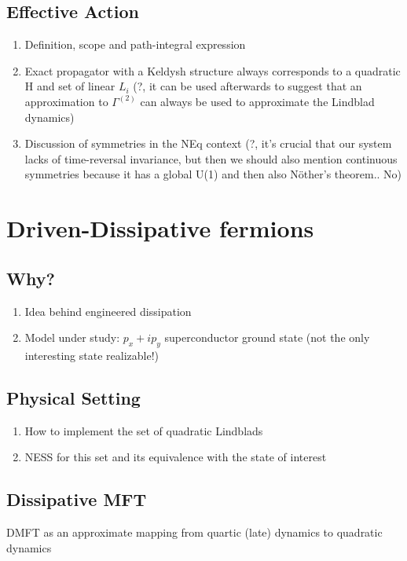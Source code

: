 \documentclass[a4paper,10pt]{article}
\theoremstyle{remark}
\newcommand{\nsec}{\vskip 0.8cm}
\begin{document}
  \subsection{Effective Action}
   \begin{enumerate}
    \item Definition, scope and path-integral expression
    \item Exact propagator with a Keldysh structure always corresponds to a quadratic H and set of linear $L_i$ (?, it can be used afterwards to suggest that an approximation to $\Gamma^{(2)}$ can always be used to approximate the Lindblad dynamics) 
    \item Discussion of symmetries in the NEq context (?, it's crucial that our system lacks of time-reversal invariance, but then we should also mention continuous symmetries because it has a global U(1) and then also Nöther's theorem.. No)
   \end{enumerate}
  \nsec 
  
  \section{Driven-Dissipative fermions}
   \subsection{Why?}
    \begin{enumerate}
     \item Idea behind engineered dissipation
     \item Model under study: $p_x+ip_y$ superconductor ground state (not the only interesting state realizable!)
    \end{enumerate}
   \subsection{Physical Setting}
    \begin{enumerate}
     \item How to implement the set of quadratic Lindblads
     \item NESS for this set and its equivalence with the state of interest
    \end{enumerate}
   \subsection{Dissipative MFT}
    DMFT as an approximate mapping from quartic (late) dynamics to quadratic dynamics
  \nsec 
  
\end{document}
